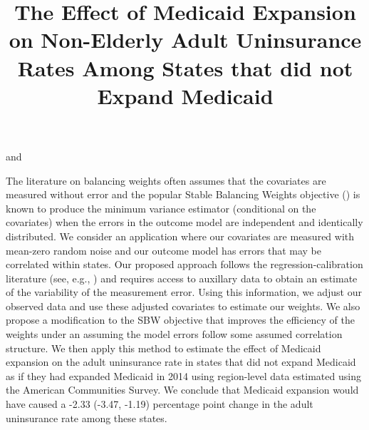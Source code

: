 \documentclass[aoas]{imsart}
\theoremstyle{plain}
\theoremstyle{remark}
\begin{document}
\begin{frontmatter}
\title{The Effect of Medicaid Expansion on Non-Elderly Adult Uninsurance Rates Among States that did not Expand Medicaid}

\begin{aug}
\author[A]{ } and
\author[A]{ }
\address[A]{Carnegie Mellon University, Heinz College and Department of Statistics and Data Science }

\end{aug}

\begin{flushleft}
The literature on balancing weights often assumes that the covariates are measured without error and the popular Stable Balancing Weights objective (\cite{zubizarreta2015stable}) is known to produce the minimum variance estimator (conditional on the covariates) when the errors in the outcome model are independent and identically distributed. We consider an application where our covariates are measured with mean-zero random noise and our outcome model has errors that may be correlated within states. Our proposed approach follows the regression-calibration literature (see, e.g., \cite{gleser1992importance}) and requires access to auxillary data to obtain an estimate of the variability of the measurement error. Using this information, we adjust our observed data and use these adjusted covariates to estimate our weights. We also propose a modification to the SBW objective that improves the efficiency of the weights under an assuming the model errors follow some assumed correlation structure. We then apply this method to estimate the effect of Medicaid expansion on the adult uninsurance rate in states that did not expand Medicaid as if they had expanded Medicaid in 2014 using region-level data estimated using the American Communities Survey. We conclude that Medicaid expansion would have caused a -2.33 (-3.47, -1.19) percentage point change in the adult uninsurance rate among these states. 
\end{flushleft}



\end{frontmatter}
\end{document}
